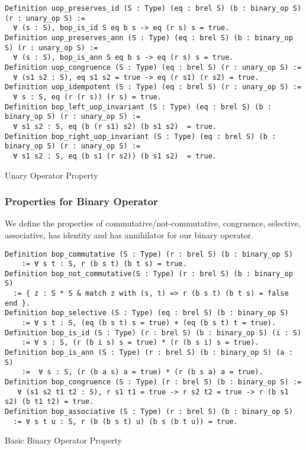 \begin{listing}[H]
\begin{verbatim}
Definition uop_preserves_id (S : Type) (eq : brel S) (b : binary_op S) (r : unary_op S) :=
  ∀ (s : S), bop_is_id S eq b s -> eq (r s) s = true.
Definition uop_preserves_ann (S : Type) (eq : brel S) (b : binary_op S) (r : unary_op S) :=
  ∀ (s : S), bop_is_ann S eq b s -> eq (r s) s = true.
Definition uop_congruence (S : Type) (eq : brel S) (r : unary_op S) := 
  ∀ (s1 s2 : S), eq s1 s2 = true -> eq (r s1) (r s2) = true. 
Definition uop_idempotent (S : Type) (eq : brel S) (r : unary_op S) := 
  ∀ s : S, eq (r (r s)) (r s) = true. 
Definition bop_left_uop_invariant (S : Type) (eq : brel S) (b : binary_op S) (r : unary_op S) :=
  ∀ s1 s2 : S, eq (b (r s1) s2) (b s1 s2)  = true.
Definition bop_right_uop_invariant (S : Type) (eq : brel S) (b : binary_op S) (r : unary_op S) :=
  ∀ s1 s2 : S, eq (b s1 (r s2)) (b s1 s2)  = true.
\end{verbatim}
\caption{Unary Operator Property} 
\label{coq:def:uop_properties}
\end{listing}

\subsubsection{Properties for Binary Operator}
We define the properties of commutative/not-commutative, congruence, selective, associative, has identity and has annihilator for our binary operator.

\begin{listing}[H]
\begin{verbatim}
Definition bop_commutative (S : Type) (r : brel S) (b : binary_op S) 
    := ∀ s t : S, r (b s t) (b t s) = true. 
Definition bop_not_commutative(S : Type) (r : brel S) (b : binary_op S) 
  := { z : S * S & match z with (s, t) => r (b s t) (b t s) = false end }.  
Definition bop_selective (S : Type) (eq : brel S) (b : binary_op S) 
    := ∀ s t : S, (eq (b s t) s = true) + (eq (b s t) t = true).    
Definition bop_is_id (S : Type) (r : brel S) (b : binary_op S) (i : S) 
    := ∀ s : S, (r (b i s) s = true) * (r (b s i) s = true).    
Definition bop_is_ann (S : Type) (r : brel S) (b : binary_op S) (a : S)
    :=  ∀ s : S, (r (b a s) a = true) * (r (b s a) a = true).    
Definition bop_congruence (S : Type) (r : brel S) (b : binary_op S) := 
   ∀ (s1 s2 t1 t2 : S), r s1 t1 = true -> r s2 t2 = true -> r (b s1 s2) (b t1 t2) = true.
Definition bop_associative (S : Type) (r : brel S) (b : binary_op S) 
  := ∀ s t u : S, r (b (b s t) u) (b s (b t u)) = true.
\end{verbatim}
\caption{Basic Binary Operator Property} 
\label{coq:def:binary_properties_basic}
\end{listing}

